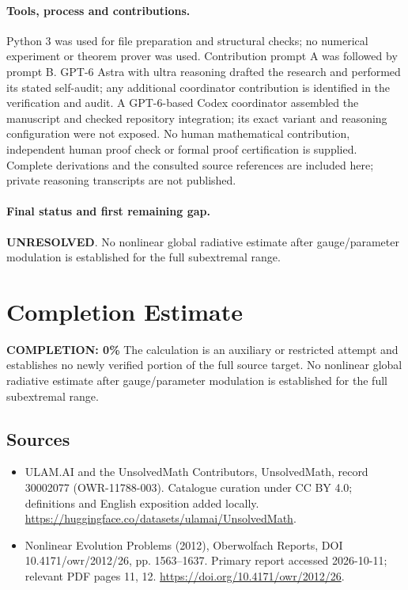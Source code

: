 \documentclass[11pt]{article}
\begin{document}
\paragraph{Tools, process and contributions.}
Python 3 was used for file preparation and structural checks; no numerical experiment or theorem prover was used. Contribution prompt A was followed by prompt B. GPT-6 Astra with ultra reasoning drafted the research and performed its stated self-audit; any additional coordinator contribution is identified in the verification and audit. A GPT-6-based Codex coordinator assembled the manuscript and checked repository integration; its exact variant and reasoning configuration were not exposed. No human mathematical contribution, independent human proof check or formal proof certification is supplied. Complete derivations and the consulted source references are included here; private reasoning transcripts are not published.

\paragraph{Final status and first remaining gap.}
\textbf{UNRESOLVED}. No nonlinear global radiative estimate after gauge/parameter modulation is established for the full subextremal range.

\section{Completion Estimate}
\noindent\textbf{COMPLETION: 0\%}
The calculation is an auxiliary or restricted attempt and establishes no newly verified portion of the full source target. No nonlinear global radiative estimate after gauge/parameter modulation is established for the full subextremal range.

\subsection{Sources}
\begin{itemize}
\item[\hypertarget{source:30002077:1}{S1}] ULAM.AI and the UnsolvedMath Contributors, UnsolvedMath, record 30002077 (OWR-11788-003). Catalogue curation under CC BY 4.0; definitions and English exposition added locally.
\url{https://huggingface.co/datasets/ulamai/UnsolvedMath}.
\item[\hypertarget{source:30002077:2}{S2}] Nonlinear Evolution Problems (2012), Oberwolfach Reports, DOI 10.4171/owr/2012/26, pp. 1563--1637. Primary report accessed 2026-10-11; relevant PDF pages 11, 12.
\url{https://doi.org/10.4171/owr/2012/26}.
\end{itemize}
\label{end:30002077}
\end{document}
